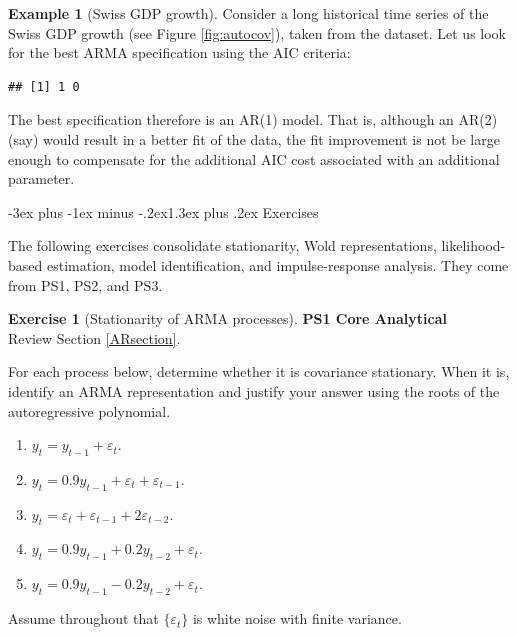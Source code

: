 \documentclass[
  11pt,
]{book}
\makeatletter
\providecommand{\tightlist}{%
  \setlength{\itemsep}{0pt}\setlength{\parskip}{0pt}}
\renewcommand\section{\@startsection{section}{1}{\z@}
  {-3ex plus -1ex minus -.2ex}{1.3ex plus .2ex}
  {\normalfont\Large\bfseries\color{TextbookInk}}}
\theoremstyle{definition}
\theoremstyle{definition}
\newtheorem{example}{Example}[chapter]
\theoremstyle{definition}
\newtheorem{exercise}{Exercise}[chapter]
\theoremstyle{definition}
\theoremstyle{remark}
\makeatother
\begin{document}
\begin{example}[Swiss GDP growth]
\protect\hypertarget{exm:SwissGrowthAIC}{}\label{exm:SwissGrowthAIC}Consider a long historical time series of the Swiss GDP growth (see Figure \ref{fig:autocov}), taken from the \citet{JST_2017} dataset. Let us look for the best ARMA specification using the AIC criteria:

\begin{verbatim}
## [1] 1 0
\end{verbatim}

The best specification therefore is an AR(1) model. That is, although an AR(2) (say) would result in a better fit of the data, the fit improvement is not be large enough to compensate for the additional AIC cost associated with an additional parameter.
\end{example}

\section{Exercises}\label{univariate-exercises}

The following exercises consolidate stationarity, Wold representations, likelihood-based estimation, model identification, and impulse-response analysis. They come from PS1, PS2, and PS3.


\begin{exercisebox}

\begin{exercise}[Stationarity of ARMA processes]
\protect\hypertarget{exr:ex-stationarity}{}\label{exr:ex-stationarity}\textbf{PS1 \textbar{} Core \textbar{} Analytical}\\
Review Section \ref{ARsection}.

For each process below, determine whether it is covariance stationary. When it is, identify an ARMA representation and justify your answer using the roots of the autoregressive polynomial.

\begin{enumerate}
\def\labelenumi{\arabic{enumi}.}
\tightlist
\item
  \(y_t=y_{t-1}+\varepsilon_t\).
\item
  \(y_t=0.9y_{t-1}+\varepsilon_t+\varepsilon_{t-1}\).
\item
  \(y_t=\varepsilon_t+\varepsilon_{t-1}+2\varepsilon_{t-2}\).
\item
  \(y_t=0.9y_{t-1}+0.2y_{t-2}+\varepsilon_t\).
\item
  \(y_t=0.9y_{t-1}-0.2y_{t-2}+\varepsilon_t\).
\end{enumerate}

Assume throughout that \(\{\varepsilon_t\}\) is white noise with finite variance.
\end{exercise}

\end{exercisebox}
\end{document}
